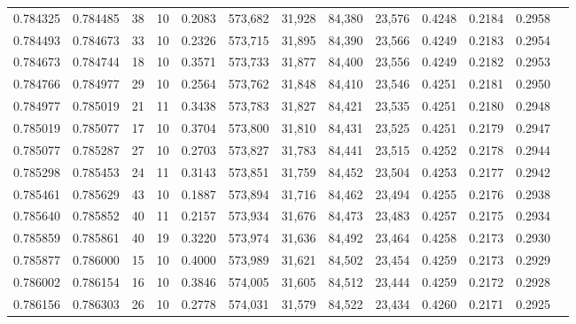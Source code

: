 \begin{tabular}{rrrrrrrrrrrrr}
0.784325 & 0.784485 &    38 &  10 &                                     0.2083 & 573,682 &  31,928 &  84,380 &  23,576 & 0.4248 & 0.2184 & 0.2958 \\
0.784493 & 0.784673 &    33 &  10 &                                     0.2326 & 573,715 &  31,895 &  84,390 &  23,566 & 0.4249 & 0.2183 & 0.2954 \\
0.784673 & 0.784744 &    18 &  10 &                                     0.3571 & 573,733 &  31,877 &  84,400 &  23,556 & 0.4249 & 0.2182 & 0.2953 \\
0.784766 & 0.784977 &    29 &  10 &                                     0.2564 & 573,762 &  31,848 &  84,410 &  23,546 & 0.4251 & 0.2181 & 0.2950 \\
0.784977 & 0.785019 &    21 &  11 &                                     0.3438 & 573,783 &  31,827 &  84,421 &  23,535 & 0.4251 & 0.2180 & 0.2948 \\
0.785019 & 0.785077 &    17 &  10 &                                     0.3704 & 573,800 &  31,810 &  84,431 &  23,525 & 0.4251 & 0.2179 & 0.2947 \\
0.785077 & 0.785287 &    27 &  10 &                                     0.2703 & 573,827 &  31,783 &  84,441 &  23,515 & 0.4252 & 0.2178 & 0.2944 \\
0.785298 & 0.785453 &    24 &  11 &                                     0.3143 & 573,851 &  31,759 &  84,452 &  23,504 & 0.4253 & 0.2177 & 0.2942 \\
0.785461 & 0.785629 &    43 &  10 &                                     0.1887 & 573,894 &  31,716 &  84,462 &  23,494 & 0.4255 & 0.2176 & 0.2938 \\
0.785640 & 0.785852 &    40 &  11 &                                     0.2157 & 573,934 &  31,676 &  84,473 &  23,483 & 0.4257 & 0.2175 & 0.2934 \\
0.785859 & 0.785861 &    40 &  19 &                                     0.3220 & 573,974 &  31,636 &  84,492 &  23,464 & 0.4258 & 0.2173 & 0.2930 \\
0.785877 & 0.786000 &    15 &  10 &                                     0.4000 & 573,989 &  31,621 &  84,502 &  23,454 & 0.4259 & 0.2173 & 0.2929 \\
0.786002 & 0.786154 &    16 &  10 &                                     0.3846 & 574,005 &  31,605 &  84,512 &  23,444 & 0.4259 & 0.2172 & 0.2928 \\
0.786156 & 0.786303 &    26 &  10 &                                     0.2778 & 574,031 &  31,579 &  84,522 &  23,434 & 0.4260 & 0.2171 & 0.2925 \\

\end{tabular}

